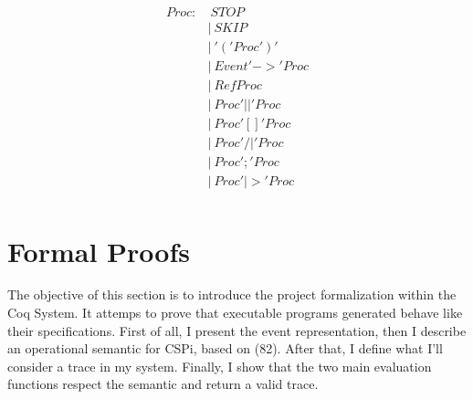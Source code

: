 \documentclass{comjnl}
\begin{document}
\begin{align}
Proc    :&\> STOP             \\
        &|\> SKIP             \\
        &|\> '(' Proc ')'     \\
        &|\> Event '->' Proc  \\
        &|\> RefProc          \\
        &|\> Proc '||' Proc   \\
        &|\> Proc '[]' Proc   \\
        &|\> Proc '/|' Proc   \\
        &|\> Proc ';' Proc    \\
        &|\> Proc '|>' Proc   \\
\end{align}


\section{Formal Proofs}
The objective of this section is to introduce the project formalization within the Coq System. It attemps to prove that executable programs generated behave like their specifications. First of all, I present the event representation, then  I describe an operational semantic for CSPi, based on (82). After that, I define what I'll consider a trace in my system. Finally, I show that the two main evaluation functions respect the semantic and return a valid trace.
\end{document}
